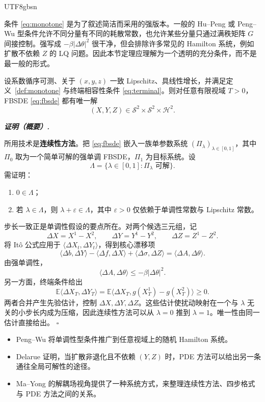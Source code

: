 \documentclass{article}
\newenvironment{proof}[1][证明]{%
  \par\smallskip\noindent\textit{\textbf{#1.}}\quad\ignorespaces
}{%
  \hfill$\square$\par\smallskip
}
\theoremstyle{plain}
\theoremstyle{definition}
\theoremstyle{remark}
\numberwithin{equation}{section}
\newcommand{\E}{\mathbb{E}}
\newcommand{\Sc}{\mathcal{S}}
\newcommand{\Hc}{\mathcal{H}}
\begin{document}
\begin{CJK*}{UTF8}{gbsn}
\begin{remark}
条件 \eqref{eq:monotone} 是为了叙述简洁而采用的强版本。一般的 Hu--Peng 或 Peng--Wu 型条件允许不同分量有不同的耗散常数，也允许某些分量只通过满秩矩阵 $G$ 间接控制。强写成 $-\beta|\Delta\theta|^2$ 很干净，但会排除许多常见的 Hamilton 系统，例如扩散不依赖 $Z$ 的 LQ 问题。因此本节定理应理解为一个透明的充分条件，而不是最一般的形式。
\end{remark}

\begin{theorem}\label{thm:hupeng}
设系数循序可测、关于 $(x,y,z)$ 一致 Lipschitz、具线性增长，并满足定义~\ref{def:monotone} 与终端相容性条件 \eqref{eq:terminal}。则对任意有限视域 $T>0$，FBSDE \eqref{eq:fbsde} 都有唯一解
\[
  (X,Y,Z)\in\Sc^2\times\Sc^2\times\Hc^2.
\]
\end{theorem}

\begin{proof}[证明（概要）]
所用技术是\textbf{连续性方法}。把 \eqref{eq:fbsde} 嵌入一族单参数系统 $(\Pi_\lambda)_{\lambda\in[0,1]}$，其中 $\Pi_0$ 取为一个简单可解的强单调 FBSDE，$\Pi_1$ 为目标系统。设
\[
  \Lambda=\{\lambda\in[0,1]:\Pi_\lambda\text{ 可解}\}.
\]
需证明：
\begin{enumerate}
  \item[(a)] $0\in\Lambda$；
  \item[(b)] 若 $\lambda\in\Lambda$，则 $\lambda+\varepsilon\in\Lambda$，其中 $\varepsilon>0$ 仅依赖于单调性常数与 Lipschitz 常数。
\end{enumerate}
步长一致正是单调性假设的要点所在。对两个候选三元组，记
\[
  \Delta X=X^1-X^2,\qquad \Delta Y=Y^1-Y^2,\qquad \Delta Z=Z^1-Z^2.
\]
将 It\^o 公式应用于 $\langle \Delta X_t,\Delta Y_t\rangle$，得到核心漂移项
\[
  \langle \Delta b,\Delta Y\rangle-\langle \Delta f,\Delta X\rangle+\langle \Delta\sigma,\Delta Z\rangle=\langle \Delta A,\Delta\theta\rangle.
\]
由强单调性，
\[
  \langle \Delta A,\Delta\theta\rangle\le-\beta|\Delta\theta|^2.
\]
另一方面，终端条件给出
\[
  \E\langle \Delta X_T,\Delta Y_T\rangle=\E\langle \Delta X_T,g(X_T^1)-g(X_T^2)\rangle\ge 0.
\]
两者合并产生先验估计，控制 $\Delta X,\Delta Y,\Delta Z$。这些估计使扰动映射在一个与 $\lambda$ 无关的小步长内成为压缩，因此连续性方法可以从 $\lambda=0$ 推到 $\lambda=1$。唯一性由同一估计直接给出。
\end{proof}

\begin{remark}[其他充分条件]
\hfill
\begin{itemize}
  \item Peng--Wu 将单调性型条件推广到任意视域上的随机 Hamilton 系统。
  \item Delarue 证明，当扩散非退化且不依赖 $(Y,Z)$ 时，PDE 方法可以给出另一条通往全局可解性的途径。
  \item Ma--Yong 的解耦场视角提供了一种系统方式，来整理连续性方法、四步格式与 PDE 方法之间的关系。
\end{itemize}
\end{remark}


\end{CJK*}
\end{document}
